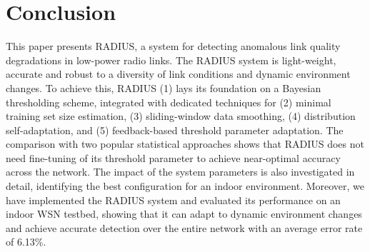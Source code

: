 \section{Conclusion} \label{sec:conclusion}

This paper presents RADIUS, a system for detecting anomalous link quality degradations in low-power radio links. The RADIUS system is light-weight, accurate and robust to a diversity of link conditions and dynamic environment changes. To achieve this, RADIUS (1) lays its foundation on a Bayesian thresholding scheme, integrated with dedicated techniques for (2) minimal training set size estimation, (3) sliding-window data smoothing, (4) distribution self-adaptation, and (5) feedback-based threshold parameter adaptation. The comparison with two popular statistical approaches shows that RADIUS does not need fine-tuning of its threshold parameter to achieve near-optimal accuracy across the network. The impact of the system parameters is also investigated in detail, identifying the best configuration for an indoor environment. Moreover, we have implemented the RADIUS system and evaluated its performance on an indoor WSN testbed, showing that it can adapt to dynamic environment changes and achieve accurate detection over the entire network with an average error rate of 6.13\%.




